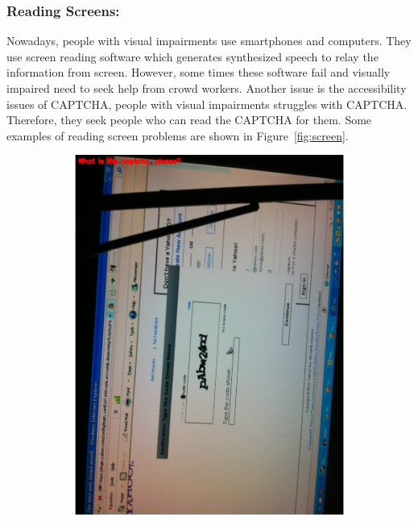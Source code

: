 \documentclass[sigconf]{acmart}
\begin{document}
\subsubsection{Reading Screens:} Nowadays, people with visual impairments use smartphones and computers. They use screen reading software which generates synthesized speech to relay the information from screen. However, some times these software fail and visually impaired need to seek help from crowd workers. Another issue is the accessibility issues of CAPTCHA, people with visual impairments struggles with CAPTCHA. Therefore, they seek people who can read the CAPTCHA for them. Some examples of reading screen problems are shown in Figure~\ref{fig:screen}. 
\begin{figure}[hbp]
        \centering
        \begin{subfigure}[b]{0.45\columnwidth}
                \includegraphics[scale=0.3]{images/screen_1.pdf}  
        \end{subfigure}%
        ~ 
        \begin{subfigure}[b]{0.45\columnwidth}

\end{subfigure}
\end{figure}
\end{document}
